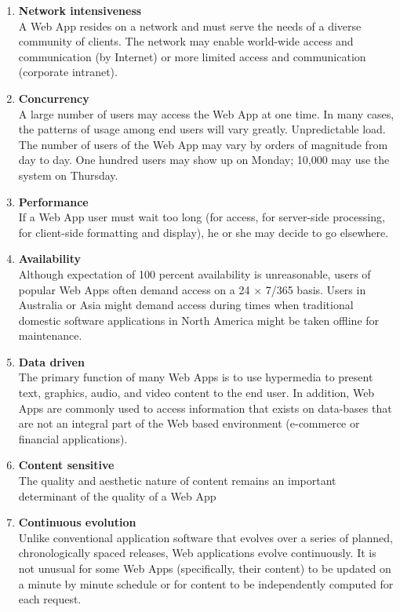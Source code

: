 \documentclass{article}
\begin{document}
	\begin{enumerate}
		\item \textbf{Network intensiveness} \\
			A Web App resides on a network and must serve the needs of a diverse community of clients.
			The network may enable world-wide access and communication (by Internet) or more limited access and
				communication (corporate intranet).

		\item \textbf{Concurrency} \\
			A large number of users may access the Web App at one time.
			In many cases, the patterns of usage among end users will vary greatly. Unpredictable load.
			The number of users of the Web App may vary by orders of magnitude from day to day.
			One hundred users may show up on Monday; 10,000 may use the system on Thursday.

		\item \textbf{Performance} \\
			If a Web App user must wait too long (for access, for server-side processing, for client-side
				formatting and display), he or she may decide to go elsewhere.

		\item \textbf{Availability} \\
			Although expectation of 100 percent availability is unreasonable, users of popular Web Apps often
				demand access on a 24 $\times$ 7/365 basis.
			Users in Australia or Asia might demand access during times when traditional domestic software
				applications in North America might be taken offline for maintenance.

		\item \textbf{Data driven} \\
			The primary function of many Web Apps is to use hypermedia to present text, graphics, audio, and
			video content to the end user.
		In addition, Web Apps are commonly used to access information that exists on data-bases that are not an
			integral part of the Web based environment (e-commerce or financial applications).

		\item \textbf{Content sensitive} \\
			The quality and aesthetic nature of content remains an important determinant of the quality of a Web
				App

		\item \textbf{Continuous evolution} \\
			Unlike conventional application software that evolves over a series of planned, chronologically
				spaced releases, Web applications evolve continuously.
			It is not unusual for some Web Apps (specifically, their content) to be updated on a minute by
				minute schedule or for content to be independently computed for each request.


\end{enumerate}
\end{document}
